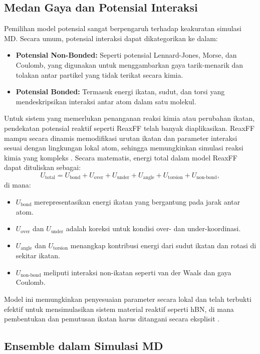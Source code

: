 \subsection{Medan Gaya dan Potensial Interaksi}
Pemilihan model potensial sangat berpengaruh terhadap keakuratan simulasi MD.
Secara umum, potensial interaksi dapat dikategorikan ke dalam:
\begin{itemize}
    \item \textbf{Potensial Non-Bonded:} Seperti potensial Lennard-Jones, Morse, dan Coulomb, yang digunakan untuk menggambarkan gaya tarik-menarik dan tolakan antar partikel yang tidak terikat secara kimia.
    \item \textbf{Potensial Bonded:} Termasuk energi ikatan, sudut, dan torsi yang mendeskripsikan interaksi antar atom dalam satu molekul.
\end{itemize}
Untuk sistem yang memerlukan penanganan reaksi kimia atau perubahan ikatan, pendekatan potensial reaktif seperti ReaxFF telah banyak diaplikasikan.
ReaxFF mampu secara dinamis memodifikasi urutan ikatan dan parameter interaksi sesuai dengan lingkungan lokal atom, sehingga memungkinkan simulasi reaksi kimia yang kompleks \cite{Lele2022}.
Secara matematis, energi total dalam model ReaxFF dapat dituliskan sebagai:
\begin{equation}
    U_{\text{total}} = U_{\text{bond}} + U_{\text{over}} + U_{\text{under}} + U_{\text{angle}} + U_{\text{torsion}} + U_{\text{non-bond}},
\end{equation}
di mana:
\begin{itemize}
    \item \( U_{\text{bond}} \) merepresentasikan energi ikatan yang bergantung pada jarak antar atom.
    \item \( U_{\text{over}} \) dan \( U_{\text{under}} \) adalah koreksi untuk kondisi over- dan under-koordinasi.
    \item \( U_{\text{angle}} \) dan \( U_{\text{torsion}} \) menangkap kontribusi energi dari sudut ikatan dan rotasi di sekitar ikatan.
    \item \( U_{\text{non-bond}} \) meliputi interaksi non-ikatan seperti van der Waals dan gaya Coulomb.
\end{itemize}
Model ini memungkinkan penyesuaian parameter secara lokal dan telah terbukti efektif untuk mensimulasikan sistem material reaktif seperti hBN, di mana pembentukan dan pemutusan ikatan harus ditangani secara eksplisit \cite{Lele2022}.

\subsection{Ensemble dalam Simulasi MD}

